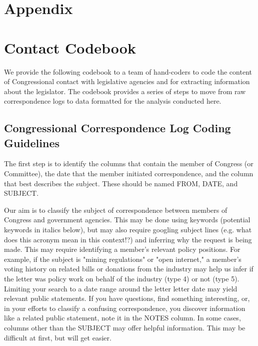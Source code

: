 \documentclass[12pt]{article}
\begin{document}



\clearpage
\appendix
\setcounter{table}{0}
\renewcommand{\thetable}{A\arabic{table}}

\section*{Appendix}




\section{Contact Codebook} \label{a:codebook}
\singlespacing

We provide the following codebook to a team of hand-coders to code the content of Congressional contact with legislative agencies and for extracting information about the legislator. The codebook provides a series of steps to move from raw correspondence logs to data formatted for the analysis conducted here.  

\subsection{Congressional Correspondence Log Coding Guidelines}

The first step is to identify the columns that contain the member of Congress (or Committee), the date that the member initiated correspondence, and the column that best describes the subject. These should be named FROM, DATE, and SUBJECT. 

Our aim is to classify the subject of correspondence between members of Congress and government agencies. This may be done using keywords (potential keywords in italics below), but may also require googling subject lines (e.g. what does this acronym mean in this context!?) and inferring why the request is being made. This may require identifying a member's relevant policy positions. For example, if the subject is "mining regulations" or "open internet," a member's voting history on related bills or donations from the industry may help us infer if the letter was policy work on behalf of the industry (type 4) or not (type 5). Limiting your search to a date range around the letter letter date may yield relevant public statements. If you have questions, find something interesting, or, in your efforts to classify a confusing correspondence, you discover information like a related public statement, note it in the NOTES column. In some cases, columns other than the SUBJECT may offer helpful information. This may be difficult at first, but will get easier. \\
\end{document}
